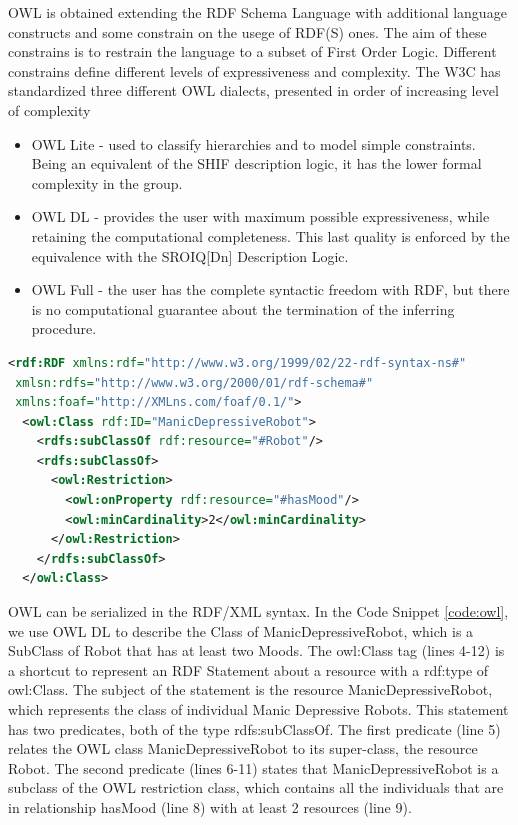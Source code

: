OWL is obtained extending the RDF Schema Language with additional language constructs and some constrain on the usege of RDF(S)  ones. The aim of these constrains is to restrain the language to a subset of First Order Logic. Different constrains define different levels of expressiveness and complexity. The W3C has standardized three different OWL dialects, presented in order of increasing level of complexity
\begin{itemize}
\item OWL Lite - used to classify hierarchies and to model simple constraints. Being an equivalent of the SHIF description logic, it has the lower formal complexity in the group.
\item OWL DL - provides the user with maximum possible expressiveness, while retaining the computational completeness. This last quality is enforced by the equivalence with the SROIQ[Dn] Description Logic.
\item OWL Full - the user has the complete syntactic freedom with RDF, but there is no computational guarantee about the termination of the inferring procedure.
\end{itemize}

\begin{lstlisting}[language=XML, caption=An example of a simple OWL DL RDF/XML document:, label=code:owl]
<rdf:RDF xmlns:rdf="http://www.w3.org/1999/02/22-rdf-syntax-ns#"
 xmlsn:rdfs="http://www.w3.org/2000/01/rdf-schema#"
 xmlns:foaf="http://XMLns.com/foaf/0.1/">
  <owl:Class rdf:ID="ManicDepressiveRobot">
    <rdfs:subClassOf rdf:resource="#Robot"/>
    <rdfs:subClassOf>
      <owl:Restriction>
        <owl:onProperty rdf:resource="#hasMood"/>
        <owl:minCardinality>2</owl:minCardinality>
      </owl:Restriction>
    </rdfs:subClassOf>
  </owl:Class>
\end{lstlisting}

OWL can be serialized in the RDF/XML syntax. In the Code Snippet \ref{code:owl}, we use OWL DL to describe the Class of ManicDepressiveRobot, which is a SubClass of Robot that has at least two Moods. The owl:Class tag (lines 4-12) is a shortcut to represent an RDF Statement about a resource with a rdf:type of owl:Class. The subject of the statement is the resource ManicDepressiveRobot, which represents the class of individual Manic Depressive Robots. This statement has two predicates, both of the type rdfs:subClassOf. The first predicate (line 5) relates the OWL class ManicDepressiveRobot to its super-class, the resource Robot. The second predicate (lines 6-11) states that ManicDepressiveRobot is a subclass of the OWL restriction class, which contains all the individuals that are in relationship hasMood (line 8) with at least 2 resources (line 9).


